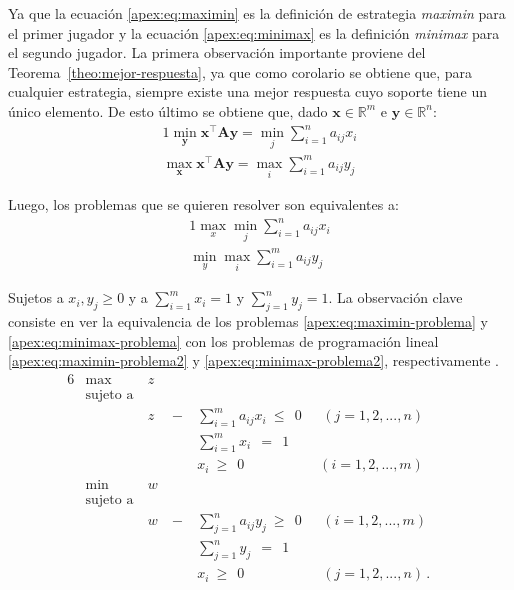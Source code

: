 Ya que la ecuación \ref{apex:eq:maximin} es la definición de estrategia \textit{maximin} para el primer jugador y la ecuación \ref{apex:eq:minimax} es la definición \textit{minimax} para el segundo jugador. La primera observación importante proviene del Teorema~\ref{theo:mejor-respuesta}, ya que como corolario se obtiene que, para cualquier estrategia, siempre existe una mejor respuesta cuyo soporte tiene un único elemento. De esto último se obtiene que, dado $\mathbf{x} \in \mathbb{R}^m$ e $\mathbf{y} \in \mathbb{R}^n$:
\begin{alignat}{1}
\min_{\mathbf{y}}{\mathbf{x}^\intercal \mathbf{A} \mathbf{y}} = \min_{j} \sum_{i=1}^n a_{ij} x_i\\
\max_{\mathbf{x}}{\mathbf{x}^\intercal \mathbf{A} \mathbf{y}} = \max_{i} \sum_{i=1}^m a_{ij} y_j
\end{alignat}

Luego, los problemas que se quieren resolver son equivalentes a:
\begin{alignat}{1}
\max_{x} \min_{j} \sum_{i=1}^n a_{ij} x_i \label{apex:eq:maximin-problema} \\
\min_{y} \max_{i} \sum_{i=1}^m a_{ij} y_j \label{apex:eq:minimax-problema}
\end{alignat}

Sujetos a $x_i, y_j \geq 0$ y a $\sum_{i=1}^m x_i = 1$ y $\sum_{j=1}^n y_j = 1$. La observación clave consiste en ver la equivalencia de los problemas \ref{apex:eq:maximin-problema} y \ref{apex:eq:minimax-problema} con los problemas de programación lineal \ref{apex:eq:maximin-problema2} y \ref{apex:eq:minimax-problema2}, respectivamente \cite[p.~232]{bib:pl-chvatal}.
\begin{alignat}{6}
\label{apex:eq:maximin-problema2}
& \max\  & z\ &  & & & &  \\ \nonumber
& \text{sujeto a}\ & & & & & & \\  \nonumber 
& & z\ & -\ & \sum_{i=1}^m a_{ij} x_i \ \leq\  \ 0 \ & \ \ (j=1, 2, ..., n) \\\nonumber
& &    &    & \sum_{i=1}^m x_i\ \ =\           \ 1 \ & \\ \nonumber
& &    &    & x_i  \ \geq\                     \ 0 \ & \ (i=1, 2, ..., m) \\
\label{apex:eq:minimax-problema2} 
& \min\  & w\ &  & & & &  \\ \nonumber
& \text{sujeto a}\ & & & & & & \\  \nonumber 
& & w\ & -\ & \sum_{j=1}^n a_{ij} y_j \ \geq\  \ 0 \ & \ \ (i=1, 2, ..., m) \\\nonumber
& &    &    & \sum_{j=1}^n y_j\ \ =\           \ 1 \ & \\ \nonumber
& &    &    & x_i  \ \geq\                     \ 0 \ & \ \ (j=1, 2, ..., n) \,. \nonumber
\end{alignat}

